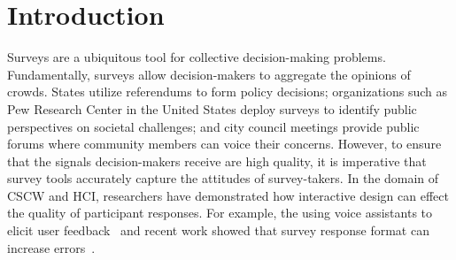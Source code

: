 \section{Introduction}

Surveys are a ubiquitous tool for collective decision-making problems. Fundamentally, surveys allow decision-makers to aggregate the opinions of crowds. States utilize referendums to form policy decisions; organizations such as Pew Research Center in the United States deploy surveys to identify public perspectives on societal challenges; and city council meetings provide public forums where community members can voice their concerns. However, to ensure that the signals decision-makers receive are high quality, it is imperative that survey tools accurately capture the attitudes of survey-takers. In the domain of CSCW and HCI, researchers have demonstrated how interactive design can effect the quality of participant responses. For example, the using voice assistants to elicit user feedback~\cite{xiaoLetMeAsk2021} and recent work showed that survey response format can increase errors~\cite{pielotDidYouMisclick2024}.


